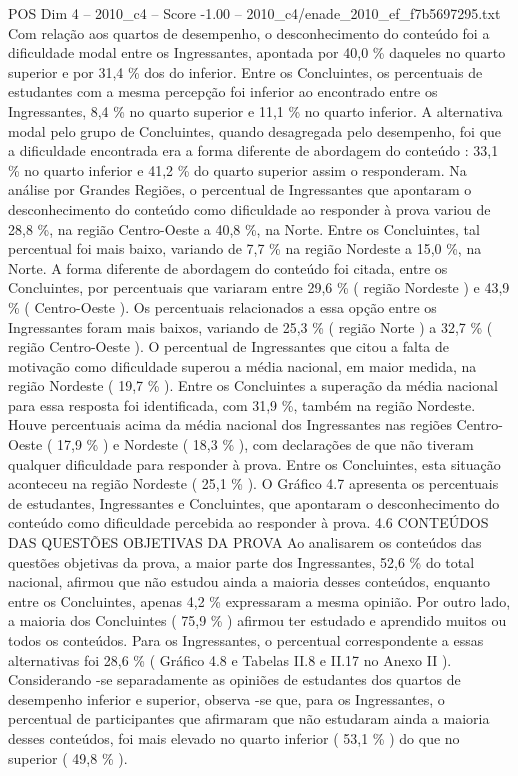 \begin{textsample}{POS Dim 4 – 2010\_c4 – Score -1.00 – 2010\_c4/enade\_2010\_ef\_f7b5697295.txt}
Com relação aos quartos de desempenho, o desconhecimento do conteúdo foi a dificuldade modal entre os Ingressantes, apontada por 40,0 \% daqueles no quarto superior e por 31,4 \% dos do inferior.
Entre os Concluintes, os percentuais de estudantes com a mesma percepção foi inferior ao encontrado entre os Ingressantes, 8,4 \% no quarto superior e 11,1 \% no quarto inferior.
A alternativa modal pelo grupo de Concluintes, quando desagregada pelo desempenho, foi que a dificuldade encontrada era a forma diferente de abordagem do conteúdo : 33,1 \% no quarto inferior e 41,2 \% do quarto superior assim o responderam.
Na análise por Grandes Regiões, o percentual de Ingressantes que apontaram o desconhecimento do conteúdo como dificuldade ao responder à prova variou de 28,8 \%, na região Centro-Oeste a 40,8 \%, na Norte.
Entre os Concluintes, tal percentual foi mais baixo, variando de 7,7 \% na região Nordeste a 15,0 \%, na Norte.
A forma diferente de abordagem do conteúdo foi citada, entre os Concluintes, por percentuais que variaram entre 29,6 \% ( região Nordeste ) e 43,9 \% ( Centro-Oeste ).
Os percentuais relacionados a essa opção entre os Ingressantes foram mais baixos, variando de 25,3 \% ( região Norte ) a 32,7 \% ( região Centro-Oeste ).
O percentual de Ingressantes que citou a falta de motivação como dificuldade superou a média nacional, em maior medida, na região Nordeste ( 19,7 \% ).
Entre os Concluintes a superação da média nacional para essa resposta foi identificada, com 31,9 \%, também na região Nordeste.
Houve percentuais acima da média nacional dos Ingressantes nas regiões Centro-Oeste ( 17,9 \% ) e Nordeste ( 18,3 \% ), com declarações de que não tiveram qualquer dificuldade para responder à prova.
Entre os Concluintes, esta situação aconteceu na região Nordeste ( 25,1 \% ).
O Gráfico 4.7 apresenta os percentuais de estudantes, Ingressantes e Concluintes, que apontaram o desconhecimento do conteúdo como dificuldade percebida ao responder à prova. 4.6 CONTEÚDOS DAS QUESTÕES OBJETIVAS DA PROVA Ao analisarem os conteúdos das questões objetivas da prova, a maior parte dos Ingressantes, 52,6 \% do total nacional, afirmou que não estudou ainda a maioria desses conteúdos, enquanto entre os Concluintes, apenas 4,2 \% expressaram a mesma opinião.
Por outro lado, a maioria dos Concluintes ( 75,9 \% ) afirmou ter estudado e aprendido muitos ou todos os conteúdos.
Para os Ingressantes, o percentual correspondente a essas alternativas foi 28,6 \% ( Gráfico 4.8 e Tabelas II.8 e II.17 no Anexo II ).
Considerando -se separadamente as opiniões de estudantes dos quartos de desempenho inferior e superior, observa -se que, para os Ingressantes, o percentual de participantes que afirmaram que não estudaram ainda a maioria desses conteúdos, foi mais elevado no quarto inferior ( 53,1 \% ) do que no superior ( 49,8 \% ).

\end{textsample}
